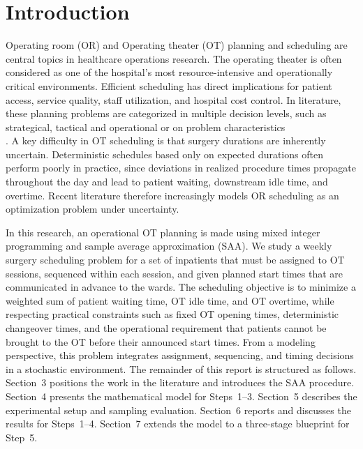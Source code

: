 \section{Introduction}
Operating room (OR) and Operating theater (OT) planning and scheduling are central topics in healthcare operations research. The operating theater is often considered as one of the hospital's most resource-intensive and operationally critical environments. Efficient scheduling has direct implications for patient access, service quality, staff utilization, and hospital cost control. In literature, these planning problems are categorized in multiple decision levels, such as strategical, tactical and operational \cite{guerriero-2010} or on problem characteristics\cite{CARDOEN2010921}\\. 
A key difficulty in OT scheduling is that surgery durations are inherently uncertain. Deterministic schedules based only on expected durations often perform poorly in practice, since deviations in realized procedure times propagate throughout the day and lead to patient waiting, downstream idle time, and overtime. Recent literature therefore increasingly models OR scheduling as an optimization problem under uncertainty.

In this research, an operational OT planning is made using mixed integer programming and sample average approximation (SAA). We study a weekly surgery scheduling problem for a set of inpatients that must be assigned to OT sessions, sequenced within each session, and given planned start times that are communicated in advance to the wards. The scheduling objective is to minimize a weighted sum of patient waiting time, OT idle time, and OT overtime, while respecting practical constraints such as fixed OT opening times, deterministic changeover times, and the operational requirement that patients cannot be brought to the OT before their announced start times. From a modeling perspective, this problem integrates assignment, sequencing, and timing decisions in a stochastic environment.
The remainder of this report is structured as follows.
Section~3 positions the work in the literature and introduces the SAA procedure.
Section~4 presents the mathematical model for Steps~1--3.
Section~5 describes the experimental setup and sampling evaluation.
Section~6 reports and discusses the results for Steps~1--4.
Section~7 extends the model to a three-stage blueprint for Step~5.





